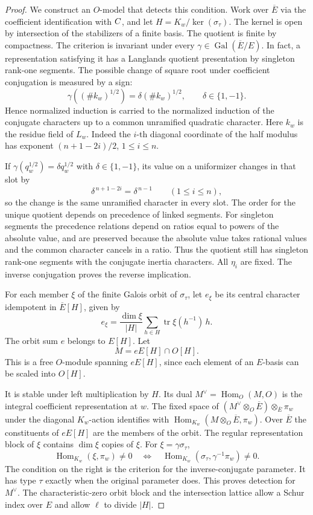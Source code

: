 \begin{proof}
We construct an \(O\)-model that detects this condition. Work over
\(\overline E\) via the coefficient identification with \(C\),
and let \(H=K_w/\ker(\sigma_\tau)\). The kernel is open by
intersection of the stabilizers of a finite basis. The quotient is
finite by compactness. The criterion is invariant under every
\(\gamma\in\operatorname{Gal}(\overline E/E)\). In fact, a
representation satisfying it has a Langlands quotient presentation
by singleton rank-one segments. The possible change of square root under coefficient conjugation is measured by a sign:
\[
 \gamma((\#k_w)^{1/2})=\delta(\#k_w)^{1/2},\qquad \delta\in\{1,-1\}.
\]
Hence normalized induction is carried to the normalized induction of the conjugate characters up to a common unramified quadratic character. Here \(k_w\) is the residue field of \(L_w\). Indeed the \(i\)-th diagonal coordinate of the half modulus has
exponent \((n+1-2i)/2\), \(1\le i\le n\).

If
\(\gamma(q_w^{1/2})=\delta q_w^{1/2}\) with \(\delta\in\{1,-1\}\), its
value on a uniformizer changes in that slot by
\[
 \delta^{\,n+1-2i}=\delta^{\,n-1}\qquad(1\le i\le n),
\]
so the change is the same unramified character in every slot.
The order for the unique quotient depends on precedence of
linked segments. For singleton segments the precedence relations
depend on ratios equal to powers of the absolute value, and are
preserved because the absolute value takes rational values and
the common character cancels in a ratio. Thus the quotient
still has singleton rank-one segments with the conjugate
inertia characters. All \(\eta_i\) are fixed. The inverse
conjugation proves the reverse implication.
\cite[Theorem 6.1 and the segment classification]{zelevinsky}

For each member \(\xi\) of the finite Galois orbit of
\(\sigma_\tau\), let \(e_\xi\) be its central character idempotent
in \(\overline E[H]\), given by
\[
   e_\xi=\frac{\dim\xi}{|H|}
                 \sum_{h\in H}\operatorname{tr}\xi(h^{-1})\,h.
\]
The orbit sum \(e\) belongs to \(E[H]\). Let
\[
   M=eE[H]\cap O[H].
\]
This is a free \(O\)-module spanning \(eE[H]\), since each element
of an \(E\)-basis can be scaled into \(O[H]\).

It is stable under
left multiplication by \(H\). Its dual
\(M^\vee=\operatorname{Hom}_O(M,O)\) is the integral coefficient
representation at \(w\). The fixed space of
\((M^\vee\otimes_O\overline E)\otimes_{\overline E}\pi_w\)
under the diagonal \(K_w\)-action identifies with
\(\operatorname{Hom}_{K_w}(M\otimes_O\overline E,\pi_w)\).
Over \(\overline E\) the constituents of \(eE[H]\) are the
members of the orbit. The regular representation block of \(\xi\) contains
\(\dim\xi\) copies of \(\xi\). For \(\xi=\gamma\sigma_\tau\),
\[
 \operatorname{Hom}_{K_w}(\xi,\pi_w)\ne0
 \quad\Longleftrightarrow\quad
 \operatorname{Hom}_{K_w}(\sigma_\tau,\gamma^{-1}\pi_w)\ne0.
\]
The condition on the right is the criterion for the
inverse-conjugate parameter. It has type \(\tau\) exactly
when the original parameter does. This proves detection for
\(M^\vee\). The characteristic-zero orbit block and the
intersection lattice allow a Schur index over \(E\) and allow
\(\ell\) to divide \(|H|\).


\end{proof}
